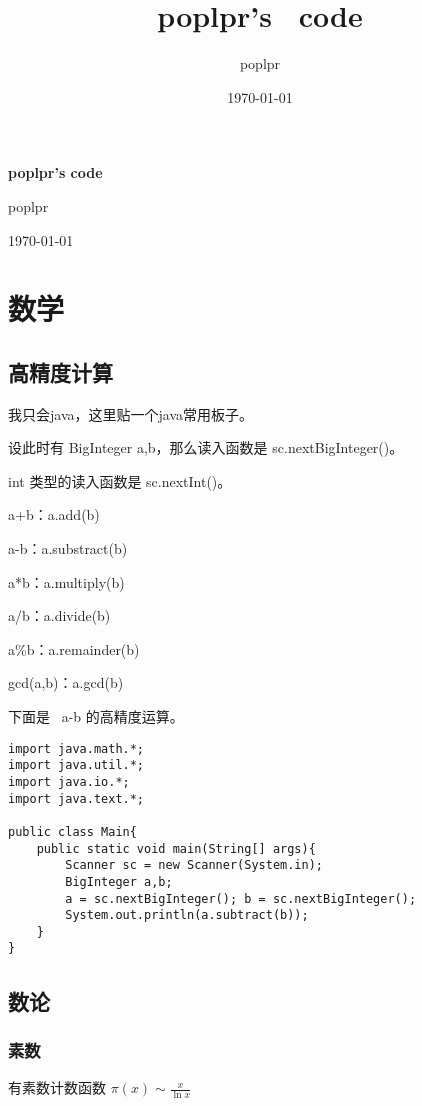 \documentclass[UTF8]{ctexart}
\title{poplpr's \ code}
\author{poplpr}
\date{\today}
\begin{document}
\begin{titlepage}
	\vspace*{\fill}
	\begin{center}
		\normalfont
		{\Huge\bfseries poplpr's code}
		
		\bigskip
		{\Large poplpr}
		
		\medskip
		\today
	\end{center}
\end{titlepage}

\tableofcontents
\newpage

\section{数学}
\subsection{高精度计算}

我只会java，这里贴一个java常用板子。

设此时有 BigInteger a,b，那么读入函数是 sc.nextBigInteger()。

int 类型的读入函数是 sc.nextInt()。

a+b：a.add(b)

a-b：a.substract(b)

a*b：a.multiply(b)

a/b：a.divide(b)

a\%b：a.remainder(b)

gcd(a,b)：a.gcd(b)

下面是 \ a-b 的高精度运算。

\begin{framed}
\begin{lstlisting}
import java.math.*;
import java.util.*;
import java.io.*;
import java.text.*;

public class Main{
    public static void main(String[] args){
        Scanner sc = new Scanner(System.in);
        BigInteger a,b;
        a = sc.nextBigInteger(); b = sc.nextBigInteger();
        System.out.println(a.subtract(b));
    }
}
\end{lstlisting}
\end{framed}

\subsection{数论}

\subsubsection{素数}
有素数计数函数 $\pi(x) \sim \frac{x}{\ln x}$
\end{document}
